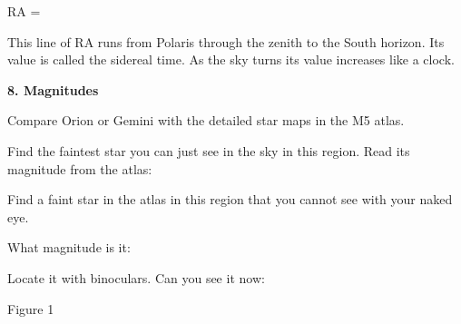 \documentclass[12pt]{article}
\begin{document}
\medskip
{\hfill RA = \makebox[4cm]{\hrulefill} \hfill }

\medskip
This line of RA runs from Polaris through the zenith to the South
horizon. Its value is called the sidereal time. As the sky turns its
value increases like a clock. 

\bigskip\noindent
{\bf 8. Magnitudes}

\bigskip\noindent Compare Orion
or Gemini with the detailed star maps
in the M5 atlas.

Find the faintest star you can just see in the sky in this region. Read its
magnitude from the atlas:  \makebox[4cm]{\hrulefill}

\smallskip\noindent
Find a faint star in the atlas in this region that you cannot see with
your naked eye.
 
What magnitude is it: \makebox[4cm]{\hrulefill}
 
Locate it with binoculars. Can you see it now: \makebox[4cm]{\hrulefill}


\newpage
\vspace*{21cm}
{\hfill Figure 1 \ \ \ \  \hfill}
\end{document}
